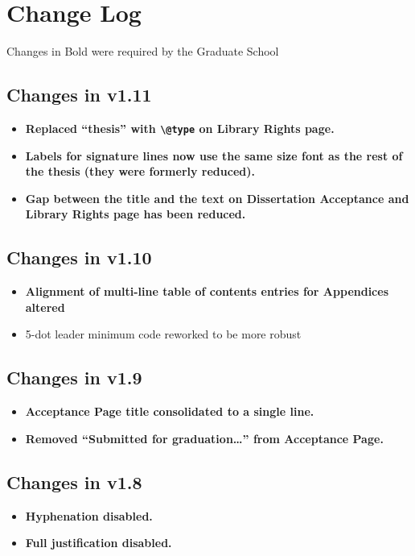 \chapter{Change Log}
Changes in Bold were required by the Graduate School

\section{Changes in v1.11}
\begin{itemize}
\item{\textbf{Replaced ``thesis'' with \verb=\@type= on Library Rights page.}}
\item{\textbf{Labels for signature lines now use the same size font as the rest of the thesis (they were formerly reduced).}}
\item{\textbf{Gap between the title and the text on Dissertation Acceptance and Library Rights page has been reduced.}}
\end{itemize}

\section{Changes in v1.10}
\begin{itemize}
\item{\textbf{Alignment of multi-line table of contents entries for Appendices altered}}
\item{5-dot leader minimum code reworked to be more robust}
\end{itemize}

\section{Changes in v1.9}
\begin{itemize}
\item{\textbf{Acceptance Page title consolidated to a single line.}}
\item{\textbf{Removed ``Submitted for graduation\ldots'' from Acceptance Page.}}
\end{itemize}

\section{Changes in v1.8}
\begin{itemize}
\item{\textbf{Hyphenation disabled.}}
\item{\textbf{Full justification disabled.}}
\end{itemize}

